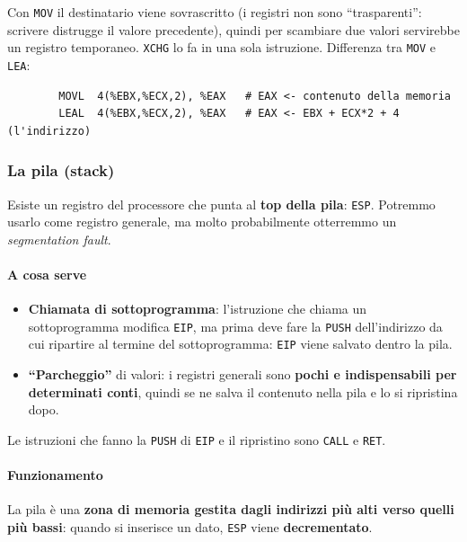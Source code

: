 \documentclass[11pt,a4paper]{article}
\begin{document}
\begin{integrazione}
Con \texttt{MOV} il destinatario viene sovrascritto (i registri non sono ``trasparenti'': scrivere distrugge il valore precedente), quindi per scambiare due valori servirebbe un registro temporaneo. \texttt{XCHG} lo fa in una sola istruzione. Differenza tra \texttt{MOV} e \texttt{LEA}:
\begin{lstlisting}
        MOVL  4(%EBX,%ECX,2), %EAX   # EAX <- contenuto della memoria
        LEAL  4(%EBX,%ECX,2), %EAX   # EAX <- EBX + ECX*2 + 4 (l'indirizzo)
\end{lstlisting}
\end{integrazione}

\subsubsection*{La pila (stack)}

Esiste un registro del processore che punta al \textbf{top della pila}: \texttt{ESP}. Potremmo usarlo come registro generale, ma molto probabilmente otterremmo un \emph{segmentation fault}.

\paragraph*{A cosa serve}

\begin{itemize}[leftmargin=*]
  \item \textbf{Chiamata di sottoprogramma}: l'istruzione che chiama un sottoprogramma modifica \texttt{EIP}, ma prima deve fare la \texttt{PUSH} dell'indirizzo da cui ripartire al termine del sottoprogramma: \texttt{EIP} viene salvato dentro la pila.
  \item \textbf{``Parcheggio''} di valori: i registri generali sono \textbf{pochi e indispensabili per determinati conti}, quindi se ne salva il contenuto nella pila e lo si ripristina dopo.
\end{itemize}

\begin{integrazione}
Le istruzioni che fanno la \texttt{PUSH} di \texttt{EIP} e il ripristino sono \texttt{CALL} e \texttt{RET}.
\end{integrazione}

\paragraph*{Funzionamento}

La pila è una \textbf{zona di memoria gestita dagli indirizzi più alti verso quelli più bassi}: quando si inserisce un dato, \texttt{ESP} viene \textbf{decrementato}.
\end{document}

